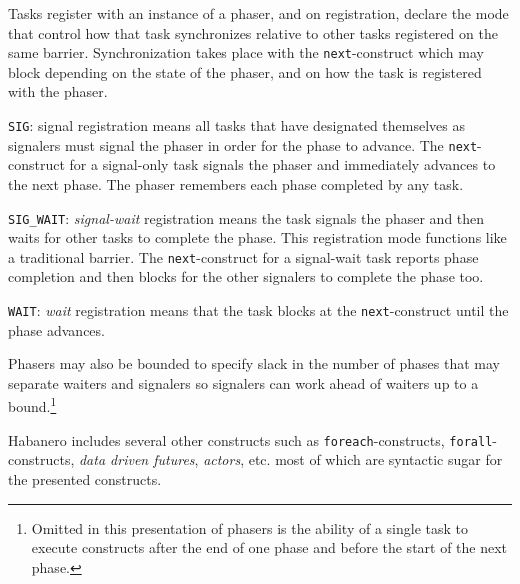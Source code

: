 Tasks register with an instance of a phaser, and on registration,
declare the mode that control how that task
synchronizes relative to other tasks registered on the same
barrier. Synchronization takes place with the \texttt{next}-construct
which may block depending on the state of the phaser, and on how the task is registered with the phaser.
\begin{compactitem}
\item \texttt{SIG}: signal registration means all tasks that have designated themselves as signalers must signal the phaser
in order for the phase to advance.  The \texttt{next}-construct for a signal-only task signals the phaser and immediately advances to the next phase.  The phaser remembers each phase completed by any task.
\item \texttt{SIG\_WAIT}: \emph{signal-wait} registration means the task signals the phaser and then waits for other tasks to complete the phase. This registration mode functions like a traditional barrier. The \texttt{next}-construct for a signal-wait task reports phase completion and then blocks for the other signalers to complete the phase too.
\item \texttt{WAIT}: \emph{wait} registration means that the task blocks at the \texttt{next}-construct until the phase advances. 
\end{compactitem}
Phasers may also be bounded to specify slack in the number of phases that may separate
waiters and signalers so signalers can work ahead of waiters
up to a bound.\footnote{Omitted in this presentation of phasers is the ability of a single task to execute constructs after the end of one phase and before the start of the next phase.}

Habanero includes several other constructs such as
\texttt{foreach}-constructs, \texttt{forall}-constructs, \emph{data
  driven futures}, \emph{actors}, etc. most of which are syntactic
sugar for the presented constructs.

